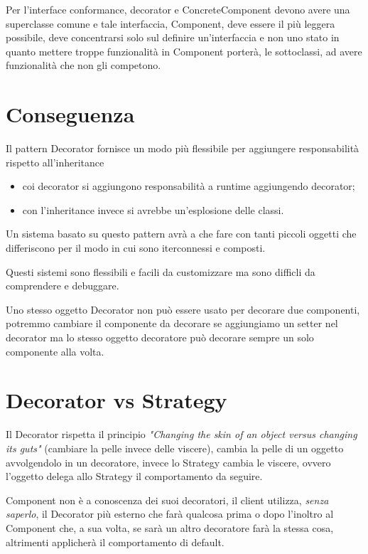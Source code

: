 Per l’interface conformance, decorator e ConcreteComponent devono avere una superclasse comune e tale interfaccia, Component, deve essere il più leggera possibile, 
deve concentrarsi solo sul definire un'interfaccia e non uno stato in quanto mettere troppe funzionalità in Component porterà, le sottoclassi, ad avere funzionalità 
che non gli competono.

\section{Conseguenza}

Il pattern Decorator fornisce un modo più flessibile per aggiungere responsabilità rispetto all’inheritance
\begin{itemize}
    \item coi decorator si aggiungono responsabilità a runtime aggiungendo decorator;
    \item con l’inheritance invece si avrebbe un’esplosione delle classi.
\end{itemize}

Un sistema basato su questo pattern avrà a che fare con tanti piccoli oggetti che differiscono per il modo in cui sono iterconnessi e composti.

Questi sistemi sono flessibili e facili da customizzare ma sono difficli da comprendere e debuggare.

Uno stesso oggetto Decorator non può essere usato per decorare due componenti, potremmo cambiare il componente da decorare se aggiungiamo un setter nel decorator ma 
lo stesso oggetto decoratore può decorare sempre un solo componente alla volta.

\section{Decorator vs Strategy}

Il Decorator rispetta il principio \textit{"Changing the skin of an object versus changing its guts"} (cambiare la pelle invece delle viscere), cambia la pelle di un 
oggetto avvolgendolo in un decoratore, invece lo Strategy cambia le viscere, ovvero l'oggetto delega allo Strategy il comportamento da seguire.
\smallskip

Component non è a conoscenza dei suoi decoratori, il client utilizza, \textit{senza saperlo}, il Decorator più esterno che farà qualcosa prima o dopo l'inoltro al 
Component che, a sua volta, se sarà un altro decoratore farà la stessa cosa, altrimenti applicherà il comportamento di default.

